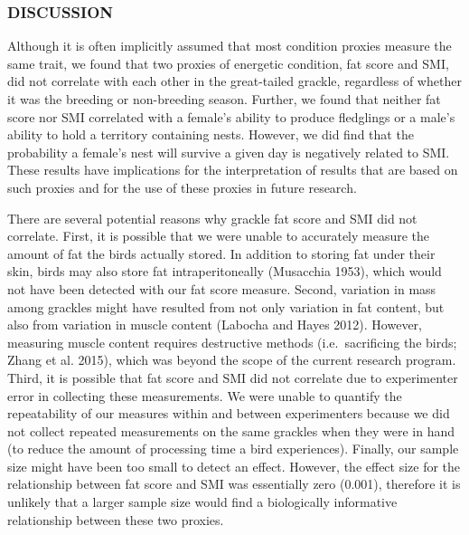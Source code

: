 \documentclass[
]{article}
\begin{document}
\hypertarget{discussion}{%
\subsubsection{DISCUSSION}\label{discussion}}

Although it is often implicitly assumed that most condition proxies
measure the same trait, we found that two proxies of energetic
condition, fat score and SMI, did not correlate with each other in the
great-tailed grackle, regardless of whether it was the breeding or
non-breeding season. Further, we found that neither fat score nor SMI
correlated with a female's ability to produce fledglings or a male's
ability to hold a territory containing nests. However, we did find that
the probability a female's nest will survive a given day is negatively
related to SMI. These results have implications for the interpretation
of results that are based on such proxies and for the use of these
proxies in future research.

There are several potential reasons why grackle fat score and SMI did
not correlate. First, it is possible that we were unable to accurately
measure the amount of fat the birds actually stored. In addition to
storing fat under their skin, birds may also store fat intraperitoneally
(Musacchia 1953), which would not have been detected with our fat score
measure. Second, variation in mass among grackles might have resulted
from not only variation in fat content, but also from variation in
muscle content (Labocha and Hayes 2012). However, measuring muscle
content requires destructive methods (i.e.~sacrificing the birds; Zhang
et al. 2015), which was beyond the scope of the current research
program. Third, it is possible that fat score and SMI did not correlate
due to experimenter error in collecting these measurements. We were
unable to quantify the repeatability of our measures within and between
experimenters because we did not collect repeated measurements on the
same grackles when they were in hand (to reduce the amount of processing
time a bird experiences). Finally, our sample size might have been too
small to detect an effect. However, the effect size for the relationship
between fat score and SMI was essentially zero (0.001), therefore it is
unlikely that a larger sample size would find a biologically informative
relationship between these two proxies.
\end{document}
